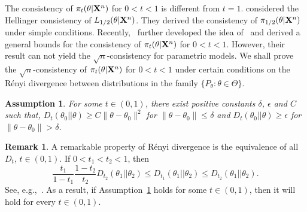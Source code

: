 \documentclass[11pt]{article}
\theoremstyle{plain}
\newtheorem{proposition}{\quad\quad Proposition}
\newtheorem{assumption}{\quad\quad Assumption}
\theoremstyle{definition}
\newtheorem{remark}{\quad\quad Remark}
\theoremstyle{remark}
\begin{document}





The consistency of $\pi_t(\theta | \mathbf{X}^{n})$ for $0<t<1$ is different from $t=1$.
\cite{kar10563} considered the Hellinger consistency of $L_{1/2}(\theta | \mathbf{X}^{n})$.
They derived the consistency of $\pi_{1/2}(\theta | \mathbf{X}^{n})$ under simple conditions.
Recently,~\cite{Bha2016} further developed the idea of~\cite{kar10563} and derived a general bounds for the consistency of $\pi_t(\theta | \mathbf{X}^{n})$ for $0<t<1$.
However, their result can not yield the $\sqrt{n}$-consistency for parametric models.
We shall prove the $\sqrt{n}$-consistency of $\pi_{t}(\theta | \mathbf{X}^{n})$ for $0<t<1$ under certain conditions on the R\'{e}nyi divergence between distributions in the family $\{P_\theta:\theta\in\Theta\}$.
\begin{assumption}\label{Assumption4}
    For some $t\in(0,1)$, there exist positive constants $\delta$, $\epsilon$ and $C$ such that,
     $D_{t}(\theta_0||\theta)  \geq  C \|\theta-\theta_0\|^2$ for $\|\theta-\theta_0\|\leq \delta$ and $D_{t}(\theta_0||\theta) \geq \epsilon$ for $\|\theta-\theta_0\|>\delta$.
\end{assumption}

\begin{remark}
    A remarkable property of R\'{e}nyi divergence is the equivalence of all $D_{t}$, $t\in (0,1)$. If $0<t_1<t_2<1$, then
    $$
    \frac{t_1}{1-t_1}\frac{1-t_2}{t_2} D_{t_2}(\theta_1||\theta_2)
    \leq D_{t_1}(\theta_1||\theta_2)\leq D_{t_2}(\theta_1||\theta_2).
    $$
    See, e.g.,~\cite{Erven2014}.
    As a result, if Assumption~\ref{Assumption4} holds for some $t \in (0,1)$, then it will hold for every $t \in (0,1)$.
\end{remark}
\end{document}

